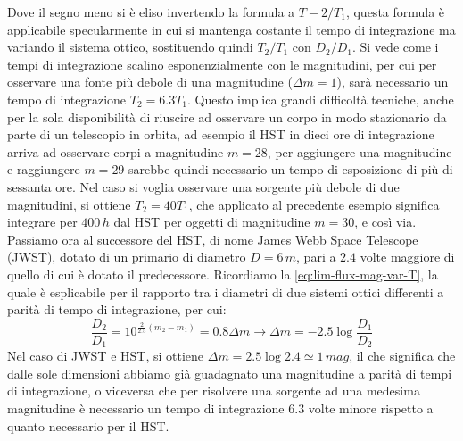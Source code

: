 Dove il segno meno si è eliso invertendo la formula a $T-2/T_1$, questa formula è applicabile specularmente in cui si mantenga costante il tempo di integrazione ma variando il sistema ottico, sostituendo quindi $T_2/T_1$ con $D_2/D_1$. Si vede come i tempi di integrazione scalino esponenzialmente con le magnitudini, per cui per osservare una fonte più debole di una magnitudine ($\Delta m=1$), sarà necessario un tempo di integrazione $T_2=6.3T_1$. Questo implica grandi difficoltà tecniche, anche per la sola disponibilità di riuscire ad osservare un corpo in modo stazionario da parte di un telescopio in orbita, ad esempio il HST in dieci ore di integrazione arriva ad osservare corpi a magnitudine $m=28$, per aggiungere una magnitudine e raggiungere $m=29$ sarebbe quindi necessario un tempo di esposizione di più di sessanta ore. Nel caso si voglia osservare una sorgente più debole di due magnitudini, si ottiene $T_2=40T_1$, che applicato al precedente esempio significa integrare per $400\, h$ dal HST per oggetti di magnitudine $m=30$, e così via. Passiamo ora al successore del HST, di nome James Webb Space Telescope (JWST), dotato di un primario di diametro $D=6\, m$, pari a $2.4$ volte maggiore di quello di cui è dotato il predecessore. Ricordiamo la \ref{eq:lim-flux-mag-var-T}, la quale è esplicabile per il rapporto tra i diametri di due sistemi ottici differenti a parità di tempo di integrazione, per cui:
\begin{equation}
	\label{eq:lim-flux-mag-var-D}
	\frac{D_2}{D_1} = 10^{\frac{2}{2.5}(m_2-m_1)} =
	0.8\Delta m \longrightarrow
	\Delta m = -2.5\log{\frac{D_1}{D_2}}
\end{equation}
Nel caso di JWST e HST, si ottiene $\Delta m=2.5\log{2.4}\simeq 1 \, mag$, il che significa che dalle sole dimensioni abbiamo già guadagnato una magnitudine a parità di tempi di integrazione, o viceversa che per risolvere una sorgente ad una medesima magnitudine è necessario un tempo di integrazione $6.3$ volte minore rispetto a quanto necessario per il HST.

